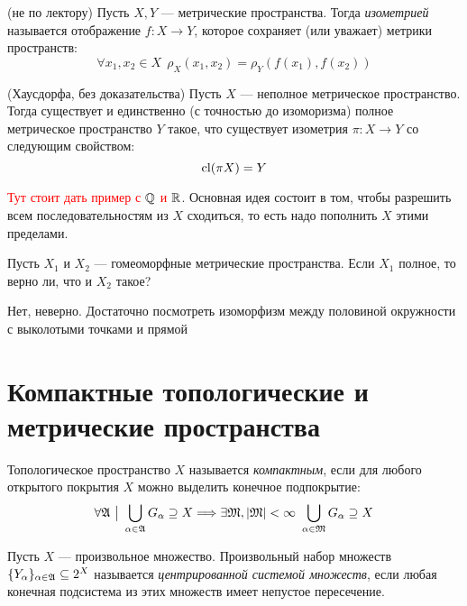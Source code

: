 \begin{definition} (не по лектору)
	Пусть $X, Y$ --- метрические пространства. Тогда \textit{изометрией} называется отображение $f \colon X \to Y$, которое сохраняет (или уважает) метрики пространств:
	\[
		\forall x_1, x_2 \in X\ \ \rho_X(x_1, x_2) = \rho_Y(f(x_1), f(x_2))
	\]
\end{definition}

\begin{theorem} (Хаусдорфа, без доказательства)
	Пусть $X$ --- неполное метрическое пространство. Тогда существует и единственно (с точностью до изоморизма) полное метрическое пространство $Y$ такое, что существует изометрия $\pi \colon X \to Y$ со следующим свойством:
	\[
		\operatorname{cl}(\pi X) = Y
	\]
\end{theorem}

\begin{note}
	\textcolor{red}{Тут стоит дать пример с $\mathbb{Q}$ и $\mathbb{R}$}. Основная идея состоит в том, чтобы разрешить всем последовательностям из $X$ сходиться, то есть надо пополнить $X$ этими пределами.
\end{note}

\begin{exercise}
	Пусть $X_1$ и $X_2$ --- гомеоморфные метрические пространства. Если $X_1$ полное, то верно ли, что и $X_2$ такое?
\end{exercise}

\begin{solution}
	Нет, неверно. Достаточно посмотреть изоморфизм между половиной окружности с выколотыми точками и прямой
\end{solution}

\section{Компактные топологические и метрические пространства}

\begin{definition}
	Топологическое пространство $X$ называется \textit{компактным}, если для любого открытого покрытия $X$ можно выделить конечное подпокрытие:
	\[
		\forall \gA \such \bigcup_{\alpha \in \gA} G_\alpha \supseteq X \Lora \exists \gM, |\gM| < \infty\ \bigcup_{\alpha \in \gM} G_\alpha \supseteq X
	\]
\end{definition}

\begin{definition}
	Пусть $X$ --- произвольное множество. Произвольный набор множеств $\{Y_\alpha\}_{\alpha \in \mathfrak{A}} \subseteq 2^X$ называется \textit{центрированной системой множеств}, если любая конечная подсистема из этих множеств имеет непустое пересечение.
\end{definition}

